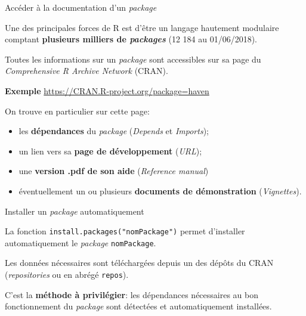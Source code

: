 \documentclass[12pt,ignorenonframetext,handout,]{beamer}
\providecommand{\tightlist}{%
  \setlength{\itemsep}{0pt}\setlength{\parskip}{0pt}}
\newcommand{\intertitre}[1]{\textcolor{redInsee}{\textbf{#1}}}
\begin{document}
\begin{frame}{Accéder à la documentation d’un \emph{package}}
\protect\hypertarget{acceder-a-la-documentation-dun-package}{}

Une des principales forces de R est d’être un langage hautement
modulaire comptant \textbf{plusieurs milliers de \emph{packages}} (12
184 au 01/06/2018).

\pause Toutes les informations sur un \emph{package} sont accessibles
sur sa page du \emph{Comprehensive R Archive Network} (CRAN).

\intertitre{Exemple} \url{https://CRAN.R-project.org/package=haven}

\pause \bigskip On trouve en particulier sur cette page:

\begin{itemize}
\tightlist
\item
  les \textbf{dépendances} du \emph{package} (\emph{Depends} et
  \emph{Imports});
\item
  un lien vers sa \textbf{page de développement} (\emph{URL});
\item
  une \textbf{version .pdf de son aide} (\emph{Reference manual})
\item
  éventuellement un ou plusieurs \textbf{documents de démonstration}
  (\emph{Vignettes}).
\end{itemize}

\end{frame}

\begin{frame}[fragile]{Installer un \emph{package} automatiquement}
\protect\hypertarget{installer-un-package-automatiquement}{}

La fonction \texttt{install.packages("nomPackage")} permet d’installer
automatiquement le \emph{package} \texttt{nomPackage}.

Les données nécessaires sont téléchargées depuis un des dépôts du CRAN
(\emph{repositories} ou en abrégé \texttt{repos}).

C’est la \textbf{méthode à privilégier}: les dépendances nécessaires au
bon fonctionnement du \emph{package} sont détectées et automatiquement
installées.

\end{frame}
\end{document}
